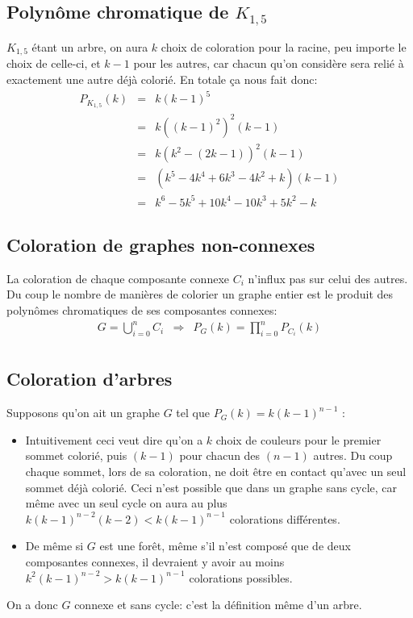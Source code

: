 \begin{itemize}
\end {itemize}

\subsection{Polynôme chromatique de $K_{1,5}$}
$K_{1,5}$ étant un arbre, on aura $k$ choix de coloration pour la racine, peu importe le choix de celle-ci, et $k-1$ pour les autres, car chacun qu'on considère sera relié à exactement une autre déjà colorié. En totale ça nous fait donc:
\begin{eqnarray*}
P_{K_{1,5}}(k) 	& = & k(k-1)^5 \\
				& = & k{((k-1)^2)}^2(k-1)	\\
				& = & k(k^2 - (2k - 1))^2(k-1)	\\
				& = & (k^5 - 4k^4  + 6k^3 - 4k^2 + k)(k-1)  \\
				& = & k^6 - 5k^5  + 10k^4 - 10k^3 + 5k^2 - k	 
\end{eqnarray*}

\subsection{Coloration de graphes non-connexes}
La coloration de chaque composante connexe $C_i$ n'influx pas sur celui des autres. Du coup le nombre de manières de colorier un graphe entier est le produit des polynômes chromatiques de ses composantes connexes:
\begin{eqnarray*}
G = \bigcup_{i=0}^n C_i & \Rightarrow & P_G(k)=\prod_{i=0}^n P_{C_i}(k) \\
\end{eqnarray*}

\subsection{Coloration d'arbres}
Supposons qu'on ait un graphe $G$ tel que $P_G(k) = k(k-1)^{n-1}$ :
\begin {itemize}
\item Intuitivement ceci veut dire qu'on a $k$ choix de couleurs pour le premier sommet colorié, puis $(k-1)$ pour chacun des $(n-1)$ autres. Du coup chaque sommet, lors de sa coloration, ne doit être en contact qu'avec un seul sommet déjà colorié. Ceci n'est possible que dans un graphe sans cycle, car même avec un seul cycle on aura au plus $k(k-1)^{n-2}(k-2) < k(k-1)^{n-1}$ colorations différentes.
\item De même si $G$ est une forêt, même s'il n'est composé que de deux composantes connexes, il devraient y avoir au moins $k^2(k-1)^{n-2} > k(k-1)^{n-1}$ colorations possibles.
\end {itemize}
On a donc $G$ connexe et sans cycle: c'est la définition même d'un arbre.

